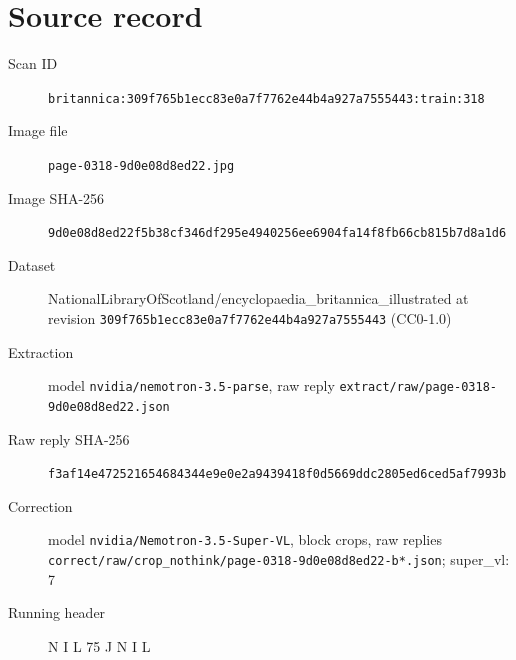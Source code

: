 \documentclass{article}
\begin{document}
\section*{Source record}
\begin{description}
\item[Scan ID] \texttt{britannica:309f765b1ecc83e0a7f7762e44b4a927a7555443:train:318}
\item[Image file] \texttt{page-0318-9d0e08d8ed22.jpg}
\item[Image SHA-256] \texttt{9d0e08d8ed22f5b38cf346df295e4940256ee6904fa14f8fb66cb815b7d8a1d6}
\item[Dataset] NationalLibraryOfScotland/encyclopaedia\_britannica\_illustrated at revision \texttt{309f765b1ecc83e0a7f7762e44b4a927a7555443} (CC0-1.0)
\item[Extraction] model \texttt{nvidia/nemotron-3.5-parse}, raw reply \texttt{extract/raw/page-0318-9d0e08d8ed22.json}
\item[Raw reply SHA-256] \texttt{f3af14e472521654684344e9e0e2a9439418f0d5669ddc2805ed6ced5af7993b}
\item[Correction] model \texttt{nvidia/Nemotron-3.5-Super-VL}, block crops, raw replies \texttt{correct/raw/crop\_nothink/page-0318-9d0e08d8ed22-b*.json}; super\_vl: 7
\item[Running header] N I L 75 J N I L
\end{description}
\end{document}
